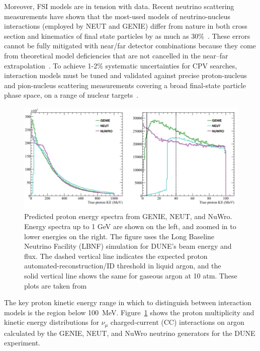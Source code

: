 Moreover, FSI models are in tension with data.  
Recent neutrino scattering measurements have shown that the most-used models of neutrino-nucleus interactions (employed by NEUT and GENIE) differ from nature in both cross section and kinematics of final state particles by as much as 30\%~\cite{Wascko:2009cn,Wascko:2011hy}. 
These errors cannot be fully mitigated with near/far detector combinations because they come from theoretical model deficiencies that are not cancelled in the near–far extrapolation~\cite{Coloma:2013rqa}. 
To achieve 1-2\% systematic uncertainties for CPV searches, interaction models must be tuned and validated against precise proton-nucleus and pion-nucleus scattering measurements covering a broad final-state particle phase space, on a range of nuclear targets~\cite{Cao:2014zra}.

\begin{figure}%
    \centering
    \includegraphics[width=12cm]{files/Figures/protons_from_argon.jpeg}%
    \caption{Predicted proton energy spectra from GENIE, NEUT, and NuWro\cite{Raaf:2018aaa}. Energy spectra up to 1 GeV are shown on the left, and zoomed in to lower energies on the right. The figure uses the Long Baseline Neutrino Facility (LBNF) simulation for DUNE's beam energy and flux. The dashed vertical line indicates the expected proton automated-reconstruction/ID threshold in liquid argon, and the solid vertical line shows the same for gaseous argon at 10 atm. These plots are taken from \cite{dune2018high}}
    \label{fig:protonsfromargon}%
\end{figure}
The key proton kinetic energy range in which to distinguish between interaction models is the region below 100~MeV.
Figure~\ref{fig:protonsfromargon} shows the proton multiplicity and kinetic energy distributions for $\nu_{\mu}$ charged-current (CC) interactions on argon calculated by the GENIE, NEUT, and NuWro neutrino generators for the DUNE experiment.
